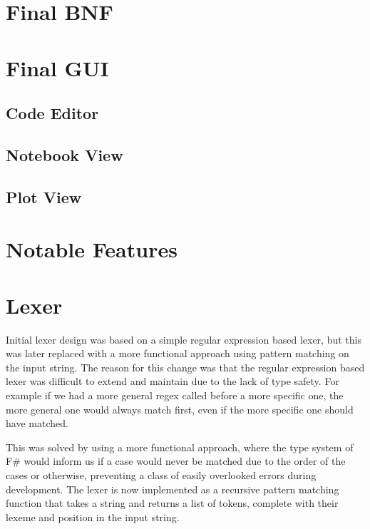 \section{Final BNF}\label{sec:final-bnf}



\section{Final GUI}\label{sec:final-gui}

\subsection{Code Editor}\label{subsec:code-editor}

\subsection{Notebook View}\label{subsec:notebook-view}

\subsection{Plot View}\label{subsec:plot-view}

\section{Notable Features}\label{sec:notable-features}


\section{Lexer}\label{sec:lexer}

Initial lexer design was based on a simple regular expression based lexer, but this was later replaced with a more
functional approach using pattern matching on the input string.
The reason for this change was that the regular expression based lexer was difficult to extend and maintain due to 
the lack of type safety.
For example if we had a more general regex called before a more specific one, the more general one would always match
first, even if the more specific one should have matched.

This was solved by using a more functional approach, where the type system of F\# would inform us if a case would 
never be matched due to the order of the cases or otherwise, preventing a class of easily overlooked errors during development.
The lexer is now implemented as a recursive pattern matching function that takes a string and returns a list of 
tokens, complete with their lexeme and position in the input string.

